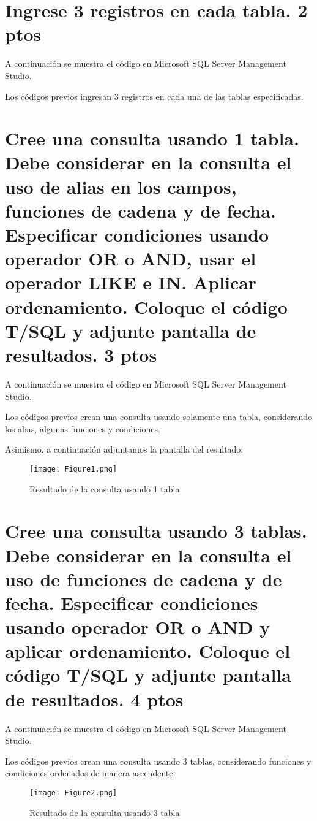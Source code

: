 \documentclass[11pt]{article}
\begin{document}
	\section*{Ingrese 3 registros en cada tabla. 2 ptos}
	
	A continuación se muestra el código en Microsoft SQL Server Management Studio.
		
	Los códigos previos ingresan 3 registros en cada una de las tablas especificadas.
	\section*{Cree una consulta usando 1 tabla. Debe considerar en la consulta el uso de alias en los campos, funciones de cadena y de fecha. Especificar condiciones usando operador OR o AND, usar el operador LIKE e IN. Aplicar ordenamiento. Coloque el código T/SQL y 
	adjunte pantalla de resultados. 3 ptos}
	
	A continuación se muestra el código en Microsoft SQL Server Management Studio.
		
	Los códigos previos crean una consulta usando solamente una tabla, considerando los alias, algunas funciones y condiciones.
	
	Asimismo, a continuación adjuntamos la pantalla del resultado:
		\begin{figure}[H]
			\centering
			\texttt{[image: Figure1.png]}
			\caption{Resultado de la consulta usando 1 tabla}
		\end{figure}
	\section*{Cree una consulta usando 3 tablas. Debe considerar en la consulta el uso de funciones de cadena y de fecha. Especificar condiciones usando operador OR o AND y aplicar ordenamiento. Coloque el código T/SQL y adjunte pantalla de resultados. 4 ptos}
	
	A continuación se muestra el código en Microsoft SQL Server Management Studio.
		
	Los códigos previos crean una consulta usando 3 tablas, considerando funciones y condiciones ordenados de manera ascendente.
		\begin{figure}[H]
			\centering
			\texttt{[image: Figure2.png]}
			\caption{Resultado de la consulta usando 3 tabla}
		\end{figure}
\end{document}
